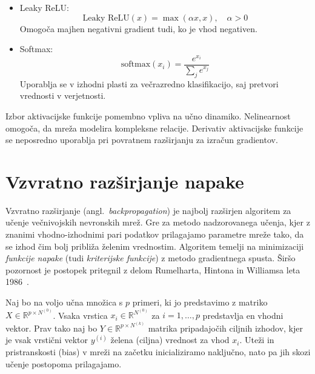 \begin{itemize}
  \item Leaky ReLU:\@
  \[
  \text{Leaky ReLU}(x) = \max(\alpha x, x), \quad \alpha > 0
  \]
  Omogoča majhen negativni gradient tudi, ko je vhod negativen.
  \begin{figure}[H]
\centering
{}
\end{figure}


  \item Softmax:
  \[
  \text{softmax}(x_i) = \frac{e^{x_i}}{\sum_j e^{x_j}}
  \]
  Uporablja se v izhodni plasti za večrazredno klasifikacijo, saj pretvori vrednosti v verjetnosti.
\end{itemize}
Izbor aktivacijske funkcije pomembno vpliva na učno dinamiko. Nelinearnost omogoča, da mreža modelira kompleksne relacije. Derivativ aktivacijske funkcije se neposredno uporablja pri povratnem razširjanju za izračun gradientov.


\section{Vzvratno razširjanje napake}

Vzvratno razširjanje (angl.~\textit{backpropagation}) je najbolj razširjen algoritem za učenje večnivojskih nevronskih mrež. Gre za metodo nadzorovanega učenja, kjer z znanimi vhodno-izhodnimi pari podatkov prilagajamo parametre mreže tako, da se izhod čim bolj približa želenim vrednostim. Algoritem temelji na minimizaciji \textit{funkcije napake} (tudi \textit{kriterijske funkcije}) z metodo gradientnega spusta. Širšo pozornost je postopek pritegnil z delom Rumelharta, Hintona in Williamsa leta 1986~\cite{Rumelhart1986}.

Naj bo na voljo učna množica s $p$ primeri, ki jo predstavimo z matriko $X \in \mathbb{R}^{p \times N^{(0)}}$. Vsaka vrstica $x_i \in \mathbb{R}^{N^{(0)}}$ za $i = 1, \dots, p$ predstavlja en vhodni vektor. Prav tako naj bo $Y \in \mathbb{R}^{p \times N^{(k)}}$ matrika pripadajočih ciljnih izhodov, kjer je vsak vrstični vektor $y^{(i)}$ želena (ciljna) vrednost za vhod $x_i$. Uteži in pristranskosti (bias) v mreži na začetku inicializiramo naključno, nato pa jih skozi učenje postopoma prilagajamo.

